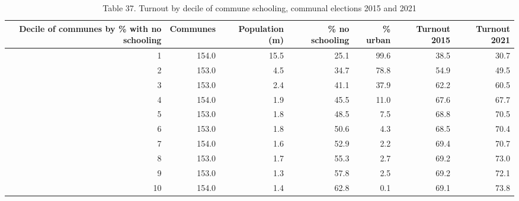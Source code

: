 \begin{table}
\caption{Table 37. Turnout by decile of commune schooling, communal elections 2015 and 2021}
\label{tab:T37_schooling_deciles}
\begin{tabular}{rrrrrrr}
\toprule
Decile of communes by \% with no schooling & Communes & Population (m) & \% no schooling & \% urban & Turnout 2015 & Turnout 2021 \\
\midrule
1 & 154.0 & 15.5 & 25.1 & 99.6 & 38.5 & 30.7 \\
2 & 153.0 & 4.5 & 34.7 & 78.8 & 54.9 & 49.5 \\
3 & 153.0 & 2.4 & 41.1 & 37.9 & 62.2 & 60.5 \\
4 & 154.0 & 1.9 & 45.5 & 11.0 & 67.6 & 67.7 \\
5 & 153.0 & 1.8 & 48.5 & 7.5 & 68.8 & 70.5 \\
6 & 153.0 & 1.8 & 50.6 & 4.3 & 68.5 & 70.4 \\
7 & 154.0 & 1.6 & 52.9 & 2.2 & 69.4 & 70.7 \\
8 & 153.0 & 1.7 & 55.3 & 2.7 & 69.2 & 73.0 \\
9 & 153.0 & 1.3 & 57.8 & 2.5 & 69.2 & 72.1 \\
10 & 154.0 & 1.4 & 62.8 & 0.1 & 69.1 & 73.8 \\
\bottomrule
\end{tabular}
\end{table}
